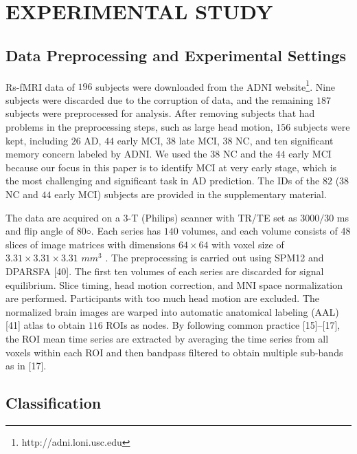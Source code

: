 \documentclass[journal]{IEEEtran}
\begin{document}
{	\section{EXPERIMENTAL STUDY}
	\subsection{Data Preprocessing and Experimental Settings}
	
	Rs-fMRI data of $196$ subjects were downloaded from the ADNI website\footnote{http://adni.loni.usc.edu}. Nine subjects were discarded
	due to the corruption of data, and the remaining $187$ subjects were preprocessed for analysis. After removing subjects that had problems in the preprocessing steps, such as large head motion,
	$156$ subjects were kept, including $26$ AD, $44$ early MCI, $38$ late MCI, $38$ NC, and ten significant memory concern labeled by ADNI. We used the $38$ NC and the $44$ early MCI because our focus in this paper is to identify MCI at very early stage, which is the most challenging and significant task in AD
	prediction. The IDs of the $82$ ($38$ NC and $44$ early MCI) subjects are provided in the supplementary material. 
	
	The data are acquired on a $3$-T (Philips) scanner with TR/TE set as $3000/30$
	ms and flip angle of $80◦$. Each series has $140$ volumes, and each volume consists of 48 slices of image matrices with dimensions
	$64 \times 64$
	with voxel size of
	$ 3.31 \times  3.31 \times 3.31$
	$mm^3$ . The preprocessing is carried out using SPM12 and DPARSFA [40]. The
	first ten volumes of each series are discarded for signal equilibrium. Slice timing, head motion correction, and MNI space normalization are performed. Participants with too much head motion are excluded. The normalized brain images are warped into automatic anatomical labeling (AAL) [41] atlas to obtain $116$ ROIs as nodes. By following common practice [15]–[17], the ROI mean time series are extracted by averaging the time series from all voxels within each ROI and then bandpass filtered to obtain multiple sub-bands as in [17].
	
	
	
	\subsection{Classification}
	
}
\end{document}
